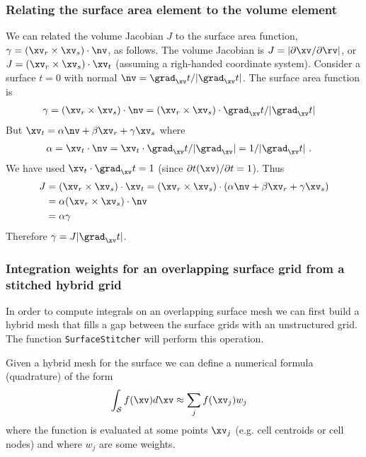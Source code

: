 \subsubsection{Relating the surface area element to the volume element}

We can related the volume Jacobian $J$ to the surface area function, 
$\gamma=(\xv_r\times\xv_s)\cdot \nv$, 
as follows. 
% 
The volume Jacobian is $J=\vert \partial \xv/\partial \rv \vert$,
or $J=(\xv_r\times\xv_s)\cdot\xv_t$ (assuming a righ-handed coordinate system). 
Consider a surface $t=0$ with normal $\nv=\grad_\xv t/\vert \grad_\xv t\vert$.
The surface area function is 
\begin{align*}
    \gamma &= (\xv_r\times\xv_s)\cdot \nv 
           = (\xv_r\times\xv_s)\cdot \grad_\xv t/\vert \grad_\xv t \vert
\end{align*}         
But $\xv_t = \alpha \nv + \beta \xv_r + \gamma \xv_s$ where 
\begin{align*}
  \alpha&=\xv_t\cdot\nv =\xv_t\cdot\grad_\xv t/\vert \grad_\xv\vert =1/\vert \grad_\xv t\vert~.
\end{align*} 
We have used $\xv_t\cdot\grad_\xv t =1$ (since $\partial t(\xv)/\partial t=1$). 
Thus
\begin{align*}
   J & =(\xv_r\times\xv_s)\cdot\xv_t 
     = (\xv_r\times\xv_s)\cdot(\alpha \nv + \beta \xv_r + \gamma \xv_s) \\
     &= \alpha (\xv_r\times\xv_s)\cdot\nv \\
     &= \alpha \gamma
\end{align*}
Therefore $\gamma = J \vert \grad_\xv t\vert$.


\subsubsection{Integration weights for an overlapping surface grid from a stitched hybrid grid}

In order to compute integrals on an overlapping surface mesh we can first build a hybrid mesh that
fills a gap between the surface grids with an unstructured grid. The function {\tt SurfaceStitcher}
will perform this operation. 

Given a hybrid mesh for the surface we can define a numerical formula (quadrature)
of the form 
\begin{align}
  \int_\Sc f(\xv) d\xv  &\approx  \sum_j f(\xv_j) w_j \label{eq:quadrature}
\end{align}
where the function is evaluated at some points $\xv_j$ (e.g. cell centroids or cell nodes) 
and where $w_j$ are some weights. 

